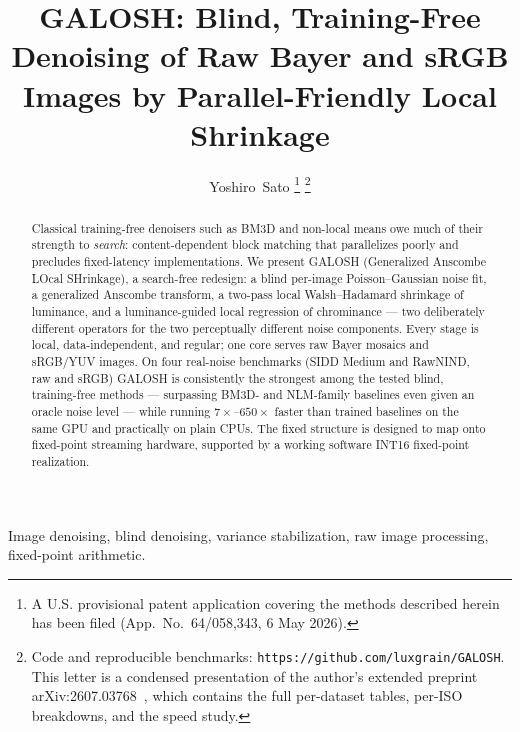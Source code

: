 \documentclass[journal]{IEEEtran}
\begin{document}
\title{GALOSH: Blind, Training-Free Denoising of Raw Bayer and sRGB Images by
Parallel-Friendly Local Shrinkage}

\author{Yoshiro~Sato%
\thanks{A U.S. provisional patent application covering the methods described
herein has been filed (App.\ No.\ 64/058,343, 6 May 2026).}%
\thanks{Code and reproducible benchmarks:
\texttt{https://github.com/luxgrain/GALOSH}. This letter is a condensed
presentation of the author's extended preprint arXiv:2607.03768~\cite{galosharxiv},
which contains the full per-dataset tables, per-ISO breakdowns, and the
speed study.}}

\maketitle

\begin{abstract}
Classical training-free denoisers such as BM3D and non-local means owe much of
their strength to \emph{search}: content-dependent block matching that
parallelizes poorly and precludes fixed-latency implementations. We present
GALOSH (Generalized Anscombe LOcal SHrinkage), a search-free redesign: a blind
per-image Poisson--Gaussian noise fit, a generalized Anscombe transform, a
two-pass local Walsh--Hadamard shrinkage of luminance, and a luminance-guided
local regression of chrominance --- two deliberately different operators for
the two perceptually different noise components. Every stage is local,
data-independent, and regular; one core serves raw Bayer mosaics and sRGB/YUV
images. On four real-noise benchmarks (SIDD Medium and RawNIND, raw and sRGB)
GALOSH is consistently the strongest among the tested blind, training-free
methods --- surpassing BM3D- and NLM-family baselines even given an oracle
noise level --- while running $7\times$--$650\times$ faster than trained
baselines on the same GPU and practically on plain CPUs. The fixed structure
is designed to map onto fixed-point streaming hardware, supported by a working
software INT16 fixed-point realization.
\end{abstract}

\begin{IEEEkeywords}
Image denoising, blind denoising, variance stabilization, raw image
processing, fixed-point arithmetic.
\end{IEEEkeywords}
\end{document}

